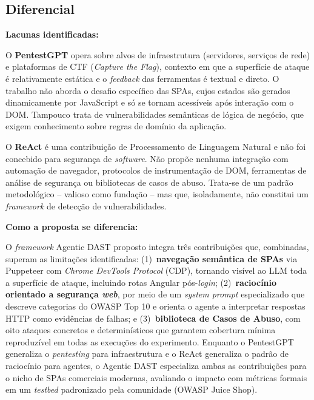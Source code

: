 \documentclass[12pt, a4paper]{article}
\begin{document}
\subsection{Diferencial}

\textbf{Lacunas identificadas:}

O \textbf{PentestGPT} opera sobre alvos de infraestrutura (servidores, serviços de rede) e plataformas de CTF (\textit{Capture the Flag}), contexto em que a superfície de ataque é relativamente estática e o \textit{feedback} das ferramentas é textual e direto.
O trabalho não aborda o desafio específico das SPAs, cujos estados são gerados dinamicamente por JavaScript e só se tornam acessíveis após interação com o DOM.
Tampouco trata de vulnerabilidades semânticas de lógica de negócio, que exigem conhecimento sobre regras de domínio da aplicação.

O \textbf{ReAct} é uma contribuição de Processamento de Linguagem Natural e não foi concebido para segurança de \textit{software}.
Não propõe nenhuma integração com automação de navegador, protocolos de instrumentação de DOM, ferramentas de análise de segurança ou bibliotecas de casos de abuso.
Trata-se de um padrão metodológico -- valioso como fundação -- mas que, isoladamente, não constitui um \textit{framework} de detecção de vulnerabilidades.

\textbf{Como a proposta se diferencia:}

O \textit{framework} Agentic DAST proposto integra três contribuições que, combinadas, superam as limitações identificadas: (1)~\textbf{navegação semântica de SPAs} via Puppeteer com \textit{Chrome DevTools Protocol} (CDP), tornando visível ao LLM toda a superfície de ataque, incluindo rotas Angular pós-\textit{login}; (2)~\textbf{raciocínio orientado a segurança \textit{web}}, por meio de um \textit{system prompt} especializado que descreve categorias do OWASP Top 10 e orienta o agente a interpretar respostas HTTP como evidências de falhas; e (3)~\textbf{biblioteca de Casos de Abuso}, com oito ataques concretos e determinísticos que garantem cobertura mínima reproduzível em todas as execuções do experimento.
Enquanto o PentestGPT generaliza o \textit{pentesting} para infraestrutura e o ReAct generaliza o padrão de raciocínio para agentes, o Agentic DAST especializa ambas as contribuições para o nicho de SPAs comerciais modernas, avaliando o impacto com métricas formais em um \textit{testbed} padronizado pela comunidade (OWASP Juice Shop).

\end{document}

